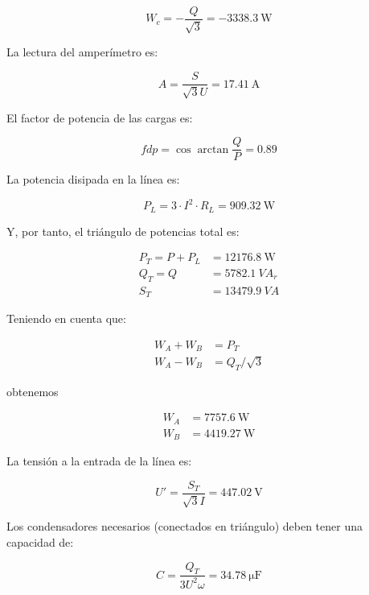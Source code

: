 \begin{equation*}
  W_c = - \frac{Q}{\sqrt{3}} = \SI{-3338.3}{\watt}
\end{equation*}

La lectura del amperímetro es:

\begin{equation*}
  A = \frac{S}{\sqrt{3} U} = \SI{17.41}{\ampere}
\end{equation*}

El factor de potencia de las cargas es:

\begin{equation*}
  fdp = \cos{\arctan{\frac{Q}{P}}} = 0.89
\end{equation*}

La potencia disipada en la línea es:

\begin{equation*}
  P_L = 3 \cdot I^2 \cdot R_L = \SI{909.32}{\watt}
\end{equation*}

Y, por tanto, el triángulo de potencias total es:

\begin{align*}
  P_T = P + P_L &= \SI{12176.8}{\watt}\\
  Q_T = Q &= \SI{5782.1}{VA}_r\\
  S_T &= \SI{13479.9}{VA}
\end{align*}

Teniendo en cuenta que:

\begin{align*}
  W_A + W_B &= P_T\\
  W_A - W_B &= Q_T / \sqrt{3}
\end{align*}

obtenemos

\begin{align*}
  W_A &= \SI{7757.6}{\watt}\\
  W_B &= \SI{4419.27}{\watt}
\end{align*}

La tensión a la entrada de la línea es:

\begin{equation*}
  U' = \frac{S_T}{\sqrt{3} I} = \SI{447.02}{\volt}
\end{equation*}

Los condensadores necesarios (conectados en triángulo) deben tener una
capacidad de:

\begin{equation*}
  C = \frac{Q_T}{3U^2\omega} = \SI{34.78}{\micro\farad}
\end{equation*}


